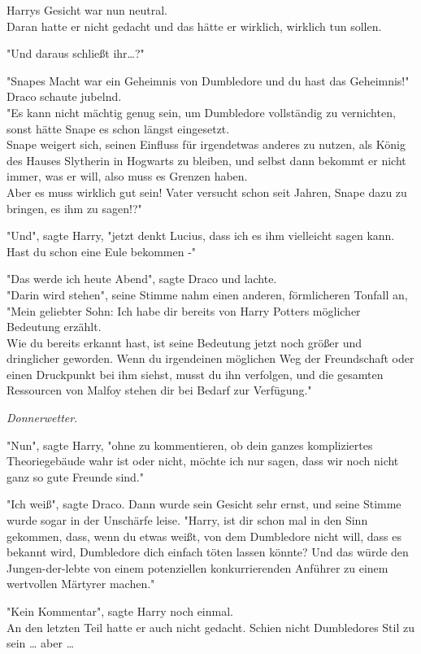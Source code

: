 {Harrys Gesicht war nun neutral.\\ Daran hatte er nicht gedacht und das hätte er wirklich, wirklich tun sollen.

"Und daraus schließt ihr…?"

"Snapes Macht war ein Geheimnis von Dumbledore und du hast das Geheimnis!"\\ Draco schaute jubelnd.\\ "Es kann nicht mächtig genug sein, um Dumbledore vollständig zu vernichten, sonst hätte Snape es schon längst eingesetzt.\\ Snape weigert sich, seinen Einfluss für irgendetwas anderes zu nutzen, als König des Hauses Slytherin in Hogwarts zu bleiben, und selbst dann bekommt er nicht immer, was er will, also muss es Grenzen haben.\\ Aber es muss wirklich gut sein! Vater versucht schon seit Jahren, Snape dazu zu bringen, es ihm zu sagen!?"

"Und", sagte Harry, "jetzt denkt Lucius, dass ich es ihm vielleicht sagen kann. Hast du schon eine Eule bekommen -"

"Das werde ich heute Abend", sagte Draco und lachte.\\ "Darin wird stehen", seine Stimme nahm einen anderen, förmlicheren Tonfall an,\\ "Mein geliebter Sohn: Ich habe dir bereits von Harry Potters möglicher Bedeutung erzählt.\\ Wie du bereits erkannt hast, ist seine Bedeutung jetzt noch größer und dringlicher geworden. Wenn du irgendeinen möglichen Weg der Freundschaft oder einen Druckpunkt bei ihm siehst, musst du ihn verfolgen, und die gesamten Ressourcen von Malfoy stehen dir bei Bedarf zur Verfügung."

\emph{Donnerwetter}.

"Nun", sagte Harry, "ohne zu kommentieren, ob dein ganzes kompliziertes Theoriegebäude wahr ist oder nicht, möchte ich nur sagen, dass wir noch nicht ganz so gute Freunde sind."

"Ich weiß", sagte Draco. Dann wurde sein Gesicht sehr ernst, und seine Stimme wurde sogar in der Unschärfe leise. "Harry, ist dir schon mal in den Sinn gekommen, dass, wenn du etwas weißt, von dem Dumbledore nicht will, dass es bekannt wird, Dumbledore dich einfach töten lassen könnte? Und das würde den Jungen-der-lebte von einem potenziellen konkurrierenden Anführer zu einem wertvollen Märtyrer machen."

"Kein Kommentar", sagte Harry noch einmal.\\ An den letzten Teil hatte er auch nicht gedacht. Schien nicht Dumbledores Stil zu sein … aber …

}
